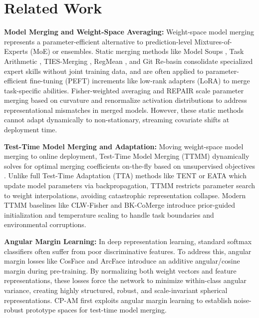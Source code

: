 \documentclass{article}
\theoremstyle{plain}
\theoremstyle{definition}
\theoremstyle{remark}
\begin{document}
\section{Related Work}
\label{sec:related}

\textbf{Model Merging and Weight-Space Averaging:} Weight-space model merging represents a parameter-efficient alternative to prediction-level Mixtures-of-Experts (MoE) or ensembles. Static merging methods like Model Soups \cite{wortsman2022model}, Task Arithmetic \cite{ilharco2023editing}, TIES-Merging \cite{yadav2023ties}, RegMean \cite{jin2023regmean}, and Git Re-basin \cite{ainsworth2023git} consolidate specialized expert skills without joint training data, and are often applied to parameter-efficient fine-tuning (PEFT) increments like low-rank adapters (LoRA) \cite{hu2021lora} to merge task-specific abilities. Fisher-weighted averaging \cite{matena2022merging} and REPAIR \cite{jordan2022repair} scale parameter merging based on curvature and renormalize activation distributions to address representational mismatches in merged models. However, these static methods cannot adapt dynamically to non-stationary, streaming covariate shifts at deployment time.

\textbf{Test-Time Model Merging and Adaptation:} Moving weight-space model merging to online deployment, Test-Time Model Merging (TTMM) dynamically solves for optimal merging coefficients on-the-fly based on unsupervised objectives \cite{yang2024test}. Unlike full Test-Time Adaptation (TTA) methods like TENT \cite{wang2021tent} or EATA \cite{niu2022eata} which update model parameters via backpropagation, TTMM restricts parameter search to weight interpolations, avoiding catastrophic representation collapse. Modern TTMM baselines like CLW-Fisher \cite{hubotter2026coacting} and BK-CoMerge introduce prior-guided initialization and temperature scaling to handle task boundaries and environmental corruptions.

\textbf{Angular Margin Learning:} In deep representation learning, standard softmax classifiers often suffer from poor discriminative features. To address this, angular margin losses like CosFace \cite{wang2018cosface} and ArcFace \cite{deng2019arcface} introduce an additive angular/cosine margin during pre-training. By normalizing both weight vectors and feature representations, these losses force the network to minimize within-class angular variance, creating highly structured, robust, and scale-invariant spherical representations. CP-AM first exploits angular margin learning to establish noise-robust prototype spaces for test-time model merging.
\end{document}
